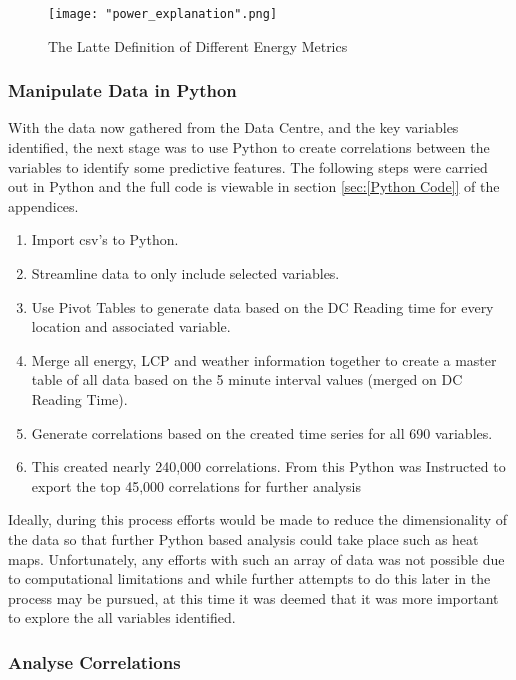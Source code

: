 \documentclass[12pt]{scrartcl}
\begin{document}
\begin{figure}[h]
  \caption{The Latte Definition of Different Energy Metrics}
  \label{fig:coffeeenergyanaliogy}
  \centering
    \texttt{[image: "power\_explanation".png]}
\end{figure} 

\subsubsection{Manipulate Data in Python}
\label{subsubsec:[Manipulate Data in Python]}

With the data now gathered from the Data Centre, and the key variables identified, the next stage was to use Python to create correlations between the variables to identify some predictive features. The following steps were carried out in Python and the full code is viewable in section \ref{sec:[Python Code]} of the appendices.

\begin{enumerate}
\item Import csv's to Python.
\item Streamline data to only include selected variables. 
\item Use Pivot Tables to generate data based on the DC Reading time for every location and associated variable. 
\item Merge all energy, LCP and weather information together to create a master table of all data based on the 5 minute interval values (merged on DC Reading Time).
\item Generate correlations based on the created time series for all 690 variables.
\item This created nearly 240,000 correlations. From this Python was Instructed to export the top 45,000 correlations for further analysis
\end{enumerate} 

Ideally, during this process efforts would be made to reduce the dimensionality of the data so that further Python based analysis could take place such as heat maps. Unfortunately, any efforts with such an array of data was not possible due to computational limitations and while further attempts to do this later in the process may be pursued, at this time it was deemed that it was more important to explore the all variables identified.

\subsubsection{Analyse Correlations}
\label{subsubsec:[Analyse Correlations]}
\end{document}
